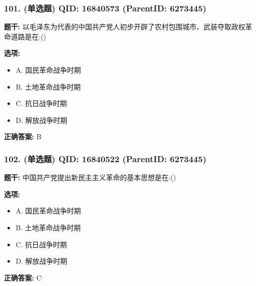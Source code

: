 \documentclass[12pt,UTF8]{ctexart}
\begin{document}
\vspace{0.3em}\hrulefill\vspace{0.7em}

\subsubsection*{101. (单选题) \small QID: 16840573 (ParentID: 6273445)}

\textbf{题干:}
以毛泽东为代表的中国共产党人初步开辟了农村包围城市、武装夺取政权革命道路是在:()



\textbf{选项:}
\begin{itemize}[leftmargin=*]

  \item A. 国民革命战争时期

  \item B. 土地革命战争时期

  \item C. 抗日战争时期

  \item D. 解放战争时期

\end{itemize}

\textbf{正确答案:}
B

\vspace{0.3em}\hrulefill\vspace{0.7em}

\subsubsection*{102. (单选题) \small QID: 16840522 (ParentID: 6273445)}

\textbf{题干:}
中国共产党提出新民主主义革命的基本思想是在:()



\textbf{选项:}
\begin{itemize}[leftmargin=*]

  \item A. 国民革命战争时期

  \item B. 土地革命战争时期

  \item C. 抗日战争时期

  \item D. 解放战争时期

\end{itemize}

\textbf{正确答案:}
C
\end{document}
